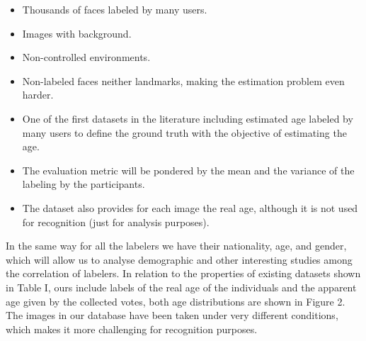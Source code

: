 \begin{itemize}
	\item Thousands of faces labeled by many users.
	\item Images with background.
	\item Non-controlled environments.
	\item Non-labeled faces neither landmarks, making the estimation problem even harder.
	\item One of the first datasets in the literature including
	estimated age labeled by many users to define the ground truth
	with the objective of estimating the age.
	\item The evaluation metric will be pondered by the mean and
	the variance of the labeling by the participants.
	\item The dataset also provides for each image the real age, although it is not used for recognition (just for analysis purposes).
\end{itemize}

In the same way for all the labelers we have their nationality, age, and gender, which will allow us to analyse demographic and other interesting studies among the correlation of labelers. In relation to the properties of existing datasets shown in Table I, ours include labels of the real age of the individuals and the apparent age given by the collected votes, both age distributions are shown in Figure 2. The images in our database have been taken under very different conditions, which makes it more challenging for recognition purposes.
